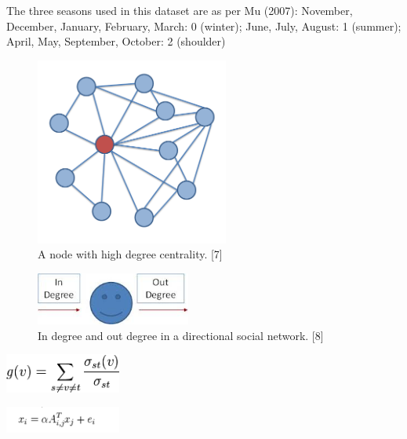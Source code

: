 \documentclass[conference,letterpaper]{IEEEtran}
\begin{document}
The three seasons used in this dataset are as per Mu (2007): 
November, December, January, February, March: 0 (winter); 
June, July, August: 1 (summer); 
April, May, September, October: 2 (shoulder) \\

\begin{center}
\begin{figure}[hb]
\centering
\includegraphics[width=2.5in]{ego_network}
\caption{
A node with high degree centrality. [7]
}
\label{fig_sim}
\end{figure}
\end{center}

\begin{center}
\begin{figure}[hb]
\centering
\includegraphics[width=2.0in]{degree_centrality}
\caption{
In degree and out degree in a directional social network. [8]
}
\label{fig_sim}
\end{figure}
\end{center}

\centerline{
  \includegraphics[width=1.5in]{betweenness_centrality.png}
}

\centerline{
  \includegraphics[width=1.5in]{alpha_centrality.png}
}
\end{document}
